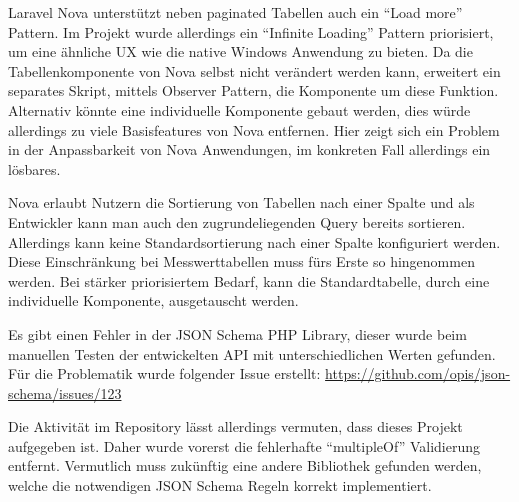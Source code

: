 \newpage

Laravel Nova unterstützt neben paginated Tabellen auch ein \enquote{Load more} Pattern.
Im Projekt wurde allerdings ein \enquote{Infinite Loading} Pattern priorisiert, um eine ähnliche UX wie die native Windows Anwendung zu bieten.
Da die Tabellenkomponente von Nova selbst nicht verändert werden kann, erweitert ein separates Skript, mittels Observer Pattern, die Komponente um diese Funktion.
Alternativ könnte eine individuelle Komponente gebaut werden, dies würde allerdings zu viele Basisfeatures von Nova entfernen.
Hier zeigt sich ein Problem in der Anpassbarkeit von Nova Anwendungen, im konkreten Fall allerdings ein lösbares.

Nova erlaubt Nutzern die Sortierung von Tabellen nach einer Spalte und als Entwickler kann man auch den zugrundeliegenden Query bereits sortieren.
Allerdings kann keine Standardsortierung nach einer Spalte konfiguriert werden.
Diese Einschränkung bei Messwerttabellen muss fürs Erste so hingenommen werden.
Bei stärker priorisiertem Bedarf, kann die Standardtabelle, durch eine individuelle Komponente, ausgetauscht werden.

Es gibt einen Fehler in der JSON Schema PHP Library, dieser wurde beim manuellen Testen der entwickelten API mit unterschiedlichen Werten gefunden.
Für die Problematik wurde folgender Issue erstellt: \url{https://github.com/opis/json-schema/issues/123}

Die Aktivität im Repository lässt allerdings vermuten, dass dieses Projekt aufgegeben ist.
Daher wurde vorerst die fehlerhafte \enquote{multipleOf} Validierung entfernt.
Vermutlich muss zukünftig eine andere Bibliothek gefunden werden, welche die notwendigen JSON Schema Regeln korrekt implementiert.
